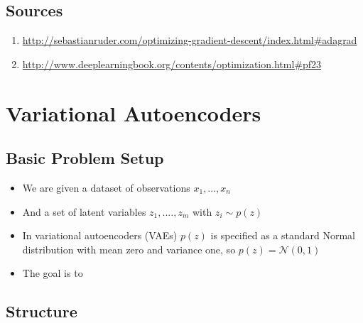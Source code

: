 \documentclass[]{article}
\begin{document}
\subsection{Sources}

\begin{enumerate}
	\item \url{http://sebastianruder.com/optimizing-gradient-descent/index.html#adagrad}
	\item \url{http://www.deeplearningbook.org/contents/optimization.html#pf23}
	
\end{enumerate}







\section{Variational Autoencoders}

\subsection{Basic Problem Setup}
\label{sec:vae_objective}

\begin{itemize}
    \item We are given a dataset of observations $x_1, ..., x_n$
    \item And a set of latent variables $z_1, ...., z_m$ with $z_i \sim p(z)$ 
    \item In variational autoencoders (VAEs) $p(z)$ is specified as a standard Normal distribution with mean zero and variance one, so $p(z) = \mathcal{N}(0,1)$
        \item The goal is to 
        
        
\end{itemize}

\subsection{Structure}
\label{}
\end{document}
